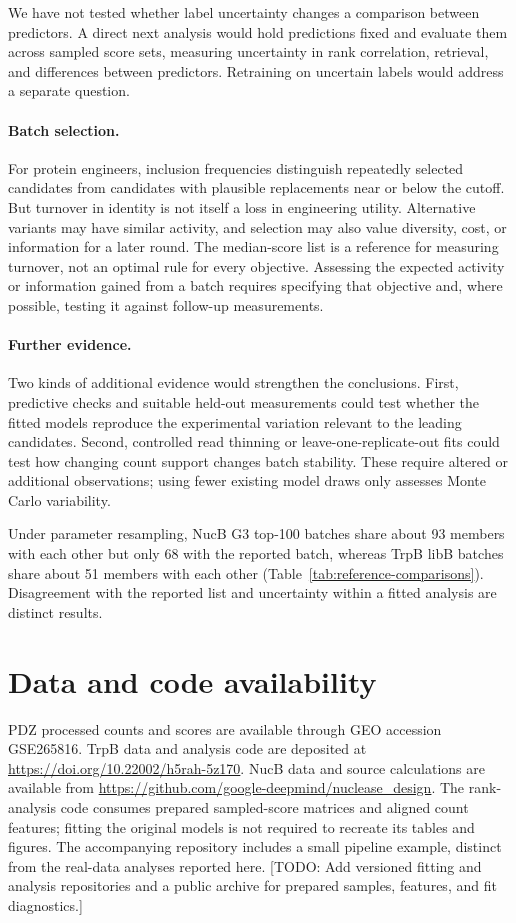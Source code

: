 \documentclass[11pt]{article}
\newcommand{\note}[1]{\textcolor{boxrule}{\small[#1]}}
\begin{document}
We have not tested whether label uncertainty changes a comparison
between predictors. A direct next analysis would hold predictions
fixed and evaluate them across sampled score sets, measuring uncertainty
in rank correlation, retrieval, and differences between predictors.
Retraining on uncertain labels would address a separate question.

\paragraph{Batch selection.}
For protein engineers, inclusion frequencies distinguish repeatedly
selected candidates from candidates with plausible replacements
near or below the cutoff. But turnover in identity is not itself
a loss in engineering utility. Alternative variants may have
similar activity, and selection may also value diversity, cost,
or information for a later round. The median-score list is a
reference for measuring turnover, not an optimal rule for every
objective. Assessing the expected activity or information gained
from a batch requires specifying that objective and, where
possible, testing it against follow-up measurements.

\paragraph{Further evidence.}
Two kinds of additional evidence would strengthen the conclusions.
First, predictive checks and suitable held-out measurements could
test whether the fitted models reproduce the experimental
variation relevant to the leading candidates. Second, controlled
read thinning or leave-one-replicate-out fits could test how
changing count support changes batch stability. These require
altered or additional observations; using fewer existing model
draws only assesses Monte Carlo variability.

Under parameter resampling, NucB G3 top-100 batches share about
93 members with each other but only 68 with the reported batch,
whereas TrpB libB batches share about 51 members with each other
(Table~\ref{tab:reference-comparisons}). Disagreement with the reported
list and uncertainty within a fitted analysis are distinct results.

\section*{Data and code availability}
PDZ processed counts and scores are available through GEO accession GSE265816.
TrpB data and analysis code are deposited at
\url{https://doi.org/10.22002/h5rah-5z170}. NucB data and source calculations
are available from \url{https://github.com/google-deepmind/nuclease_design}.
The rank-analysis code consumes prepared sampled-score matrices and aligned
count features; fitting the original models is not required to recreate its
tables and figures. The accompanying repository includes a small pipeline
example, distinct from the real-data analyses reported here.
\note{TODO: Add versioned fitting and analysis repositories and a public
archive for prepared samples, features, and fit diagnostics.}
\end{document}
